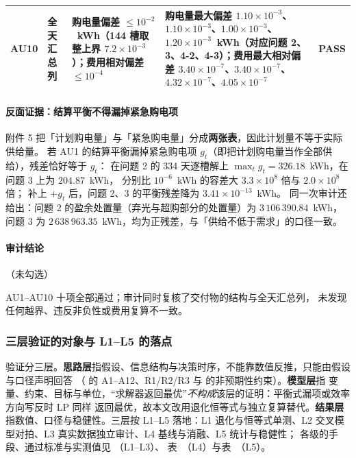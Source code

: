 \begin{table}[htbp]
\begin{tabularx}{\linewidth}{C{0.9cm} L{3.4cm} L{2.9cm} Y C{1.2cm}}
    AU10 & 全天汇总列 & 购电量偏差 $\le10^{-2}$~kWh（144 槽取整上界 $7.2\times10^{-3}$）；费用相对偏差 $\le10^{-4}$
       & 购电量最大偏差 $1.10\times10^{-3}$、$1.10\times10^{-3}$、$1.00\times10^{-3}$、$1.20\times10^{-3}$~kWh（对应问题 2、3、4-2、4-3）；费用最大相对偏差 $3.40\times10^{-7}$、$3.40\times10^{-7}$、$4.32\times10^{-7}$、$4.05\times10^{-7}$ & PASS \\
    \bottomrule
  \end{tabularx}
\end{table}

\paragraph{反面证据：结算平衡不得漏掉紧急购电项}

附件 5 把「计划购电量」与「紧急购电量」分成\textbf{两张表}，因此计划量不等于实际供给量。
若 AU1 的结算平衡漏掉紧急购电项 $g_t$（即把计划购电量当作全部供给），残差恰好等于 $g_t$：
在问题 2 的 334 天逐槽解上 $\max_t g_t=326.18$~kWh，在问题 3 上为 $204.87$~kWh，
分别比 $10^{-6}$~kWh 的容差大 $3.3\times10^{8}$ 倍与 $2.0\times10^{8}$ 倍；
补上 $+g_t$ 后，问题 2、3 的平衡残差降为 $3.41\times10^{-13}$~kWh。
同一次审计还给出：问题 2 的盈余处置量（弃光与超购部分的处置量）为 $3\,106\,390.84$~kWh，
问题 3 为 $2\,638\,963.35$~kWh，均为正残差，与「供给不低于需求」的口径一致。

\paragraph{审计结论}

\begin{center}
\qquad
{}（未勾选）
\end{center}

\noindent AU1--AU10 十项全部通过；审计同时复核了交付物的结构与全天汇总列，
未发现任何越界、违反非负性或费用复算不一致。


\subsubsection{三层验证的对象与 L1--L5 的落点}\label{sec:verify-three-app}
验证分三层。\textbf{思路层}指假设、信息结构与决策时序，不能靠数值反推，只能由假设与口径声明回答
（ 的 A1--A12、R1/R2/R3 与  的非预期性约束）。\textbf{模型层}指
变量、约束、目标与单位，“求解器返回最优”\emph{不构成}该层的证明：平衡式漏项或效率方向写反时 LP 同样
返回最优，故本文改用退化恒等式与独立复算替代。\textbf{结果层}指数值、口径与稳健性。三层按 L1--L5
落地：L1 退化与恒等式单测、L2 交叉模型对拍、L3 真实数据独立审计、L4 基线与消融、L5 统计与稳健性；
各级的手段、通过标准与实测值见 （L1--L3）、
表~（L4）与表~（L5）。

